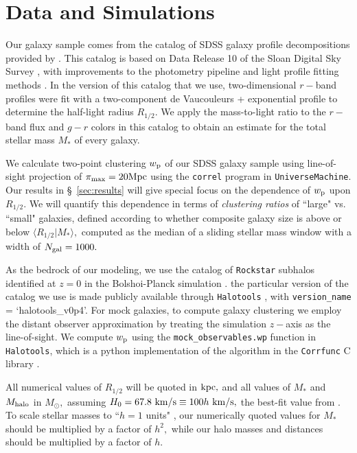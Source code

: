 \documentclass[usenatbib,usegraphicx,letterpaper]{mn2e}
\newcommand{\rhalf}{R_{1/2}}
\newcommand{\mstar}{M_{\ast}}
\newcommand{\mhalo}{M_{\rm halo}}
\newcommand{\wproj}{w_{\rm p}}
\newcommand{\kpc}{{\rm kpc}}
\newcommand{\mpc}{{\rm Mpc}}
\newcommand{\msun}{M_\odot}
\newcommand{\kms}{{\rm km/s}}
\begin{document}
\section{Data and Simulations}
\label{sec:data}

Our galaxy sample comes from the catalog of SDSS galaxy profile decompositions provided by \citet{meert_etal15}. This catalog is based on Data Release 10 of the Sloan Digital Sky Survey \citep[SDSS,][]{ahn_etal14}, with improvements to the photometry pipeline and light profile fitting methods \citep{vikram_etal10,bernardi_etal13,bernardi_etal14,meert_etal13}. In the version of this catalog that we use, two-dimensional $r-$band profiles were fit with a two-component de Vaucouleurs + exponential profile to determine the half-light radius $\rhalf.$ We apply the \citet{bell_etal03} mass-to-light ratio to the $r-$band flux and $g-r$ colors in this catalog to obtain an estimate for the total stellar mass $\mstar$ of every galaxy.

We calculate two-point clustering $\wproj$ of our SDSS galaxy sample using line-of-sight projection of $\pi_{\rm max}=20\mpc$ using the {\tt correl} program in {\tt UniverseMachine}. Our results in \S~\ref{sec:results} will give special focus on the dependence of $\wproj$ upon $\rhalf.$ We will quantify this dependence in terms of {\em clustering ratios} of ``large" vs. ``small" galaxies, defined according to whether composite galaxy size is above or below $\langle\rhalf\vert\mstar\rangle,$ computed as the median of a sliding stellar mass window with a width of $N_{\rm gal}=1000.$

As the bedrock of our modeling, we use the catalog of {\tt Rockstar} subhalos identified at $z=0$ in the Bolshoi-Planck simulation \citep{klypin_etal11,behroozi12_rockstar,behroozi12_consistent_trees,riebe_etal13,rodriguez_puebla16_bolplanck}. the particular version of the catalog we use is made publicly available through {\tt Halotools} \citep{hearin_etal16}, with {\tt version\_name} = `halotools\_v0p4'. For mock galaxies, to compute galaxy clustering we employ the distant observer approximation by treating the simulation $z-$axis as the line-of-sight. We compute $\wproj$ using the {\tt mock\_observables.wp} function in {\tt Halotools}, which is a python implementation of the algorithm in the {\tt Corrfunc} C library \citep{sinha_etal17}. 

All numerical values of $\rhalf$ will be quoted in $\kpc,$ and all values of $\mstar$ and $\mhalo$ in $\msun,$ assuming $H_0=67.8~\kms\equiv100h~\kms,$ the best-fit value from \citet{planck15}. To scale stellar masses to ``$h=1$ units" \citep{croton13}, our numerically quoted values for $\mstar$ should be multiplied by a factor of $h^2,$ while our halo masses and distances should be multiplied by a factor of $h.$
\end{document}
